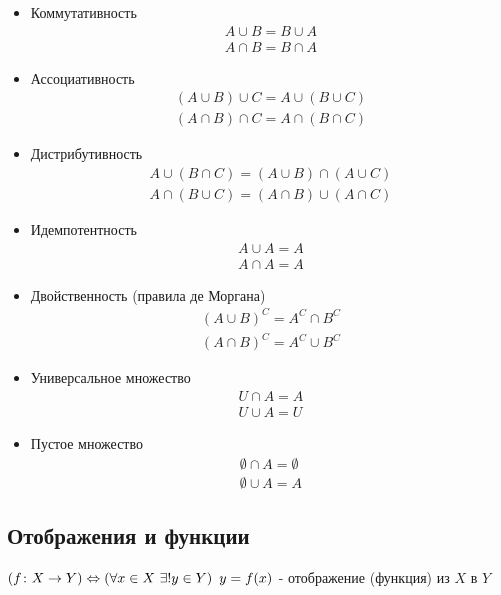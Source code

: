\begin{itemize}
    \item Коммутативность
    \begin{align*}
        A \cup B = B \cup A \\
        A \cap B = B \cap A
    \end{align*}
    \item Ассоциативность
    \begin{align*}
        (A \cup B) \cup C = A \cup (B \cup C) \\
        (A \cap B) \cap C = A \cap (B \cap C)
    \end{align*}
    \item Дистрибутивность
    \begin{align*}
        A \cup (B \cap C) = (A \cup B) \cap (A \cup C) \\
        A \cap (B \cup C) = (A \cap B) \cup (A \cap C)
    \end{align*}
    \item Идемпотентность
    \begin{align*}
        A \cup A = A \\
        A \cap A = A
    \end{align*}
    \item Двойственность (правила де Моргана)
    \begin{align*}
        (A \cup B)^C = A^C \cap B^C \\
        (A \cap B)^C = A^C \cup B^C
    \end{align*}
    \item Универсальное множество
    \begin{align*}
        U \cap A = A \\
        U \cup A = U
    \end{align*}
    \item Пустое множество
    \begin{align*}
        \emptyset \cap A = \emptyset \\
        \emptyset \cup A = A
    \end{align*}
\end{itemize}


\subsection{Отображения и функции}

\begin{definition}
    $(f \colon X \rightarrow Y) \Leftrightarrow \left(\forall x \in X\ \exists! y \in Y\right)\ y = f(x)$ - отображение (функция) из $X$ в $Y$
\end{definition}

